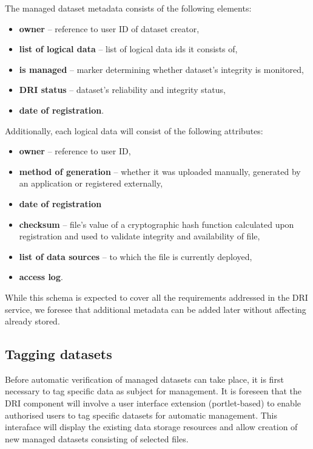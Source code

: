The managed dataset metadata consists of the following elements:

\begin{itemize}
	\item \textbf{owner} -- reference to user ID of dataset creator,
	\item \textbf{list of logical data} -- list of logical data ids it consists of,
	\item \textbf{is managed} -- marker determining whether dataset's integrity
	is monitored,
	\item \textbf{DRI status} -- dataset's reliability and integrity status,
	\item \textbf{date of registration}.
\end{itemize}

\noindent
Additionally, each logical data will consist of the following attributes:

\begin{itemize}
	\item \textbf{owner} -- reference to user ID,
	\item \textbf{method of generation} -- whether it was uploaded manually, 
	generated by an application or registered externally,
	\item \textbf{date of registration}
	\item \textbf{checksum} -- file's value of a cryptographic hash function
	calculated upon registration and used to validate integrity and 
	availability of file,
	\item \textbf{list of data sources} -- to which the file is currently
	deployed,
	\item \textbf{access log}.
\end{itemize}

While this schema is expected to cover all the requirements addressed in the
DRI service, we foresee that additional metadata can be added later without
affecting already stored.

\subsection{Tagging datasets}
Before automatic verification of managed datasets can take place, it is first
necessary to tag specific data as subject for management. It is foreseen that
the DRI component will involve a user interface extension (portlet-based) to
enable authorised users to tag specific datasets for automatic management. This
interaface will display the existing data storage resources and allow creation
of new managed datasets consisting of selected files.\\

